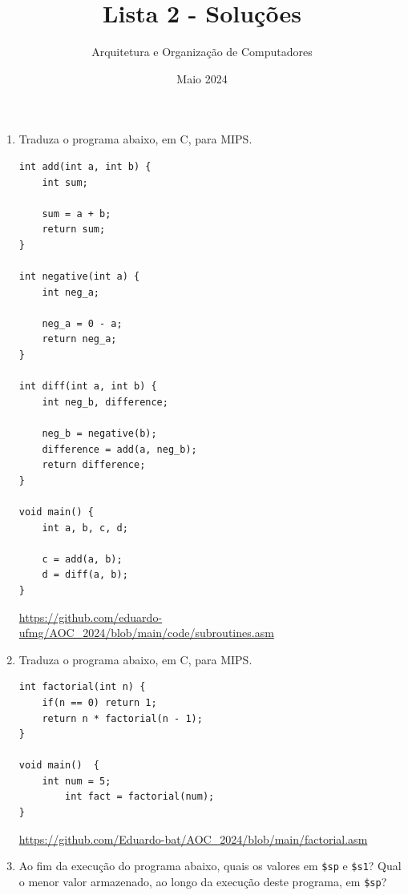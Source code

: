 \documentclass{article}
\title{\Huge Lista 2 - Soluções}
\author{\Large Arquitetura e Organização de Computadores}
\date{Maio 2024}
\begin{document}
\maketitle

\begin{enumerate}
\item Traduza o programa abaixo, em C, para MIPS.

\begin{center}
    \begin{minipage}{0.55\textwidth}
        \begin{lstlisting}[frame=single]
int add(int a, int b) {
    int sum;

    sum = a + b;
    return sum;
}

int negative(int a) {
    int neg_a;
    
    neg_a = 0 - a;
    return neg_a;
}

int diff(int a, int b) {
    int neg_b, difference;

    neg_b = negative(b);
    difference = add(a, neg_b);
    return difference;
}

void main() {
    int a, b, c, d;

    c = add(a, b);
    d = diff(a, b);
}
        \end{lstlisting}
    \end{minipage}
\end{center}

    \url{https://github.com/eduardo-ufmg/AOC_2024/blob/main/code/subroutines.asm}

\item Traduza o programa abaixo, em C, para MIPS.
\begin{center}
    \begin{minipage}{0.6\textwidth}
        \begin{lstlisting}[frame=single]
int factorial(int n) {
	if(n == 0) return 1;
	return n * factorial(n - 1);
}

void main()  {
	int num = 5;
        int fact = factorial(num);
}
        \end{lstlisting}
    \end{minipage}
\end{center}

\url{https://github.com/Eduardo-bat/AOC_2024/blob/main/factorial.asm}

\item Ao fim da execução do programa abaixo, quais os valores em \verb|$sp| e \verb|$s1|?  Qual o menor valor armazenado, ao longo da execução deste programa, em \verb|$sp|?


\end{enumerate}
\end{document}
